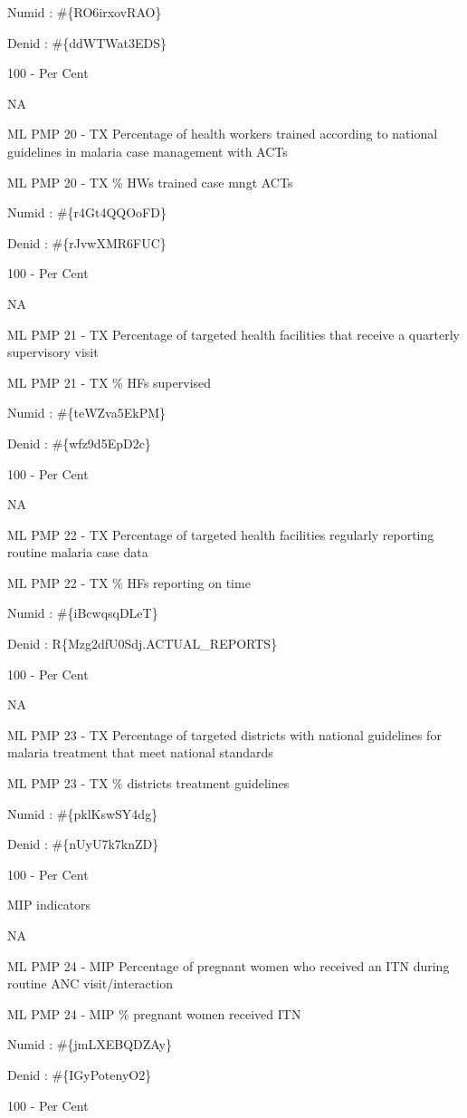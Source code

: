\documentclass[]{book}
\begin{document}
Numid : \#\{RO6irxovRAO\}

Denid : \#\{ddWTWat3EDS\}

100 - Per Cent

NA

ML PMP 20 - TX Percentage of health workers trained according to national guidelines in malaria case management with ACTs

ML PMP 20 - TX \% HWs trained case mngt ACTs

Numid : \#\{r4Gt4QQOoFD\}

Denid : \#\{rJvwXMR6FUC\}

100 - Per Cent

NA

ML PMP 21 - TX Percentage of targeted health facilities that receive a quarterly supervisory visit

ML PMP 21 - TX \% HFs supervised

Numid : \#\{teWZva5EkPM\}

Denid : \#\{wfz9d5EpD2c\}

100 - Per Cent

NA

ML PMP 22 - TX Percentage of targeted health facilities regularly reporting routine malaria case data

ML PMP 22 - TX \% HFs reporting on time

Numid : \#\{iBcwqsqDLeT\}

Denid : R\{Mzg2dfU0Sdj.ACTUAL\_REPORTS\}

100 - Per Cent

NA

ML PMP 23 - TX Percentage of targeted districts with national guidelines for malaria treatment that meet national standards

ML PMP 23 - TX \% districts treatment guidelines

Numid : \#\{pklKswSY4dg\}

Denid : \#\{nUyU7k7knZD\}

100 - Per Cent

MIP indicators

NA

ML PMP 24 - MIP Percentage of pregnant women who received an ITN during routine ANC visit/interaction

ML PMP 24 - MIP \% pregnant women received ITN

Numid : \#\{jmLXEBQDZAy\}

Denid : \#\{IGyPotenyO2\}

100 - Per Cent
\end{document}
